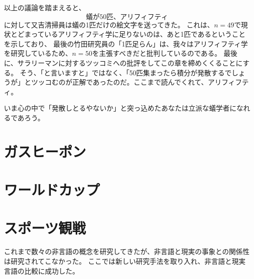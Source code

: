 以上の議論を踏まえると、
\[
蟻が50匹、
アリフィフティ
\]
に対して又吉清掃員は蟻の1匹だけの絵文字を送ってきた。
これは、$n=49$で現状とどまっているアリフィフティ学に足りないのは、あと1匹であるということを示しており、
最後の竹田研究員の「1匹足らん」は、我々はアリフィフティ学を研究しているため、$n=50$を主張すべきだと批判しているのである。
最後に、サラリーマンに対するツッコミへの批評をしてこの章を締めくくることにする。
そう、「と言いますと」ではなく、「50匹集まったら積分が発散するでしょうが」とツッコむのが正解であったのだ。ここまで読んでくれて、アリフィフティ。
\par
いま心の中で「発散しとるやないか」と突っ込めたあなたは立派な蟻学者になれるであろう。




\newpage
\section{ガスヒーポン}


\newpage 
\section{ワールドカップ}
\section{スポーツ観戦}
これまで数々の非言語の概念を研究してきたが、非言語と現実の事象との関係性は研究されてこなかった。
ここでは新しい研究手法を取り入れ、非言語と現実言語の比較に成功した。

